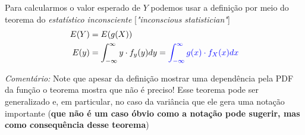 \documentclass{article}
\makeatletter
\renewcommand\bf[1]{\textbf{#1}}
\renewcommand\it[1]{\textit{#1}}
\def\mcolor#1#{\@mcolor{#1}}
\def\@mcolor#1#2#3{%
  \protect\leavevmode
  \begingroup
    \color#1{#2}#3%
  \endgroup
}
\makeatother
\begin{document}
Para calcularmos o valor esperado de $Y$ podemos usar a definição por meio do teorema do
\it{estatístico inconsciente} [\it{"inconscious statistician"}]
\begin{align*}
    E(Y) &= E(g(X)) \\
    E(y) &= \int^\infty_{-\infty} y \cdot f_y(y)dy = \mcolor{blue}{\int^\infty_{-\infty} g(x) \cdot
    f_X(x)dx} \\
\end{align*}

\it{Comentário:} Note que apesar da definição mostrar uma dependência pela PDF da função o teorema
mostra que não é preciso! Esse teorema pode ser generalizado e, em particular, no caso da variância
que ele gera uma notação importante (\bf{que não é um caso óbvio como a notação pode sugerir, mas
como consequência desse teorema})
\end{document}
